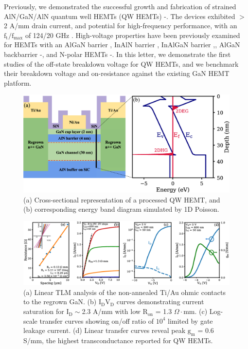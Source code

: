 \documentclass[journal]{IEEEtran}
\begin{document}
Previously, we demonstrated the successful growth and fabrication of strained AlN/GaN/AlN quantum well HEMTs (QW HEMTs) \cite{b4}-\cite{b6}. The devices exhibited $>$ 2 A/mm drain current, and potential for high-frequency performance, with an $\mathrm{f_t}/\mathrm{f_{max}}$ of 124/20 GHz \cite{b6}. High-voltage properties have been previously examined for HEMTs with an AlGaN barrier \cite{b16,b17}, InAlN barrier \cite{b25,b26}, InAlGaN barrier \cite{b18},\cite{b27}, AlGaN backbarrier \cite{b12}-\cite{b15}, and N-polar HEMTs \cite{b19}-\cite{b24}. In this letter, we demonstrate the first studies of the off-state breakdown voltage for QW HEMTs, and we benchmark their breakdown voltage and on-resistance against the existing GaN HEMT platform.
\begin{figure}[!b]
\centering
\includegraphics[width=\columnwidth]{Figure1.eps}
\caption{(a) Cross-sectional representation of a processed QW HEMT, and (b) corresponding energy band diagram simulated by 1D Poisson. }
\label{fig:epi}
\end{figure}

\begin{figure}[!t]
\centering
\includegraphics[width=\textwidth]{Figure2.eps}
\caption{(a) Linear TLM analysis of the non-annealed Ti/Au ohmic contacts to the regrown GaN. (b) $\mathrm{I_DV_D}$ curves demonstrating current saturation for $\mathrm{I_D}\sim$2.3 A/mm with low $\mathrm{R_{on}}$ = 1.3 $\Omega\cdot$mm. (c) Log-scale transfer curves showing on/off ratio of $\mathrm{10^4}$ limited by gate leakage current. (d) Linear transfer curves reveal peak $\mathrm{g_m}$ = 0.6 S/mm, the highest transconductance reported for QW HEMTs. }
\label{fig:IdVg}
\end{figure}
\end{document}

